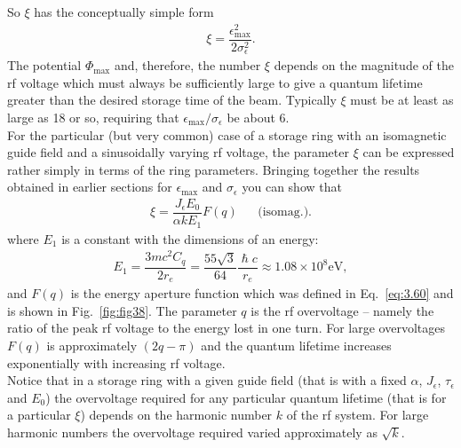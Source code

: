 So $\xi$ has the conceptually simple form
\begin{align}
	\xi = \dfrac{\epsilon_\text{max}^2}{2\sigma_\epsilon^2}.
\end{align}
The potential $\Phi_\text{max}$ and, therefore, the number $\xi$ depends on the magnitude of the rf voltage which must always be sufficiently large to give a quantum lifetime greater than the desired storage time of the beam. Typically $\xi$ must be at least as large as 18 or so, requiring that $\epsilon_\text{max}/\sigma_\epsilon$ be about 6.\\
For the particular (but very common) case of a storage ring with an isomagnetic guide field and a sinusoidally varying rf voltage, the parameter $\xi$ can be expressed rather simply in terms of the ring parameters. Bringing together the results obtained in earlier sections for $\epsilon_\text{max}$ and $\sigma_\epsilon$ you can show that
\begin{align}
	\xi = \dfrac{J_\epsilon E_0}{\alpha k E_1} F(q) && \text{(isomag.)}.
\end{align}
where $E_1$ is a constant with the dimensions of an energy:
\begin{align}
	E_1 = \dfrac{3mc^2 C_q}{2 r_e} = \dfrac{55 \sqrt{3}}{64} \dfrac{\hslash c}{r_e} \approx 1.08 \times 10^8 \text{eV},
\end{align}
and $F(q)$ is the energy aperture function which was defined in Eq.~\eqref{eq:3.60} and is shown in Fig.~\ref{fig:fig38}. The parameter $q$ is the rf overvoltage -- namely the ratio of the peak rf voltage to the energy lost in one turn. For large overvoltages $F(q)$ is approximately $(2q- \pi)$ and the quantum lifetime increases exponentially with increasing rf voltage.\\
Notice that in a storage ring with a given guide field (that is with a fixed $\alpha$,
$J_\epsilon$, $\tau_\epsilon$ and $E_0$) the overvoltage required for any particular quantum lifetime (that is for a particular $\xi$) depends on the harmonic number $k$ of the rf system. For large harmonic numbers the overvoltage required varied approximately as $\sqrt{k}$.


